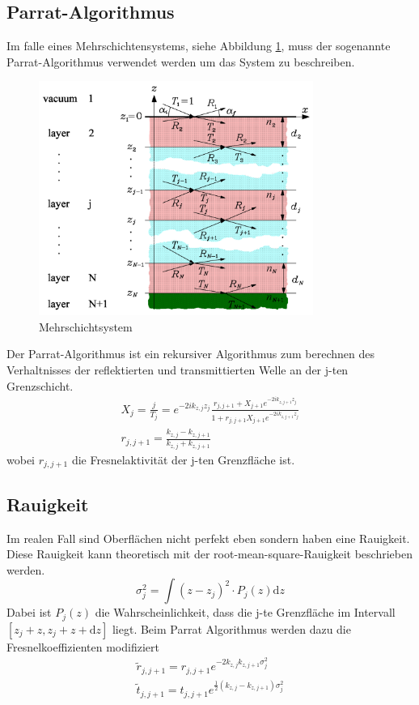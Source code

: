     \subsection{Parrat-Algorithmus}
        Im falle eines Mehrschichtensystems, siehe Abbildung \ref{fig:mehrschicht}, muss der sogenannte Parrat-Algorithmus verwendet werden um das System zu beschreiben.
        \begin{figure}[ht]
            \centering
            \includegraphics[width = 0.8\textwidth]{bilder/Mehrschichtsystem.png}
            \caption{Mehrschichtsystem}
            \label{fig:mehrschicht}
        \end{figure}
        Der Parrat-Algorithmus ist ein rekursiver Algorithmus zum berechnen des Verhaltnisses der reflektierten und transmittierten Welle an der j-ten Grenzschicht.
        \begin{align}
            \label{eqn:parratt}
            X_j = \frac{j}{T_j} = e^{-2ik_{z,j}z_j} \frac{r_{j,j+1} + X_{j+1} e^{-2ik_{z,j+1}z_j}}{1 + r_{j,j+1}X_{j+1} e^{-2ik_{z,j+1}z_j}}\\
            r_{j,j+1} = \frac{k_{z,j} - k_{z,j+1}}{k_{z,j} + k_{z,j+1}}
        \end{align}
        wobei $r_{j,j+1}$ die Fresnelaktivität der j-ten Grenzfläche ist.
    \subsection{Rauigkeit}
        Im realen Fall sind Oberflächen nicht perfekt eben sondern haben eine Rauigkeit.
        Diese Rauigkeit kann theoretisch mit der root-mean-square-Rauigkeit beschrieben werden.
        \begin{equation}
            \sigma_j^2 = \int \left(z-z_j\right)^2\cdot P_j(z) \text{d}z        
        \end{equation}
        Dabei ist $P_j(z)$ die Wahrscheinlichkeit, dass die j-te Grenzfläche im Intervall $[z_j+z,z_j+z+\text{d}z]$ liegt.
        Beim Parrat Algorithmus werden dazu die Fresnelkoeffizienten modifiziert
        \begin{align}
            \label{eqn:rauheit}
            \tilde{r}_{j,j+1} = r_{j,j+1} e^{-2k_{z,j}k_{z,j+1} \sigma_j^2}\\
            \tilde{t}_{j,j+1} = t_{j,j+1} e^{ \frac{1}{2} \left(k_{z,j} -k_{z,j+1}\right)\sigma_j^2}
        \end{align}
